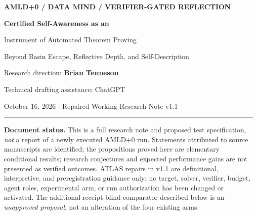 \documentclass[11pt,letterpaper]{article}
\begin{document}
\begin{center}
{\footnotesize\sffamily\bfseries\color{accent} AMLD+0 / DATA MIND / VERIFIER-GATED REFLECTION}\par
\vspace{8pt}
{\LARGE\bfseries\color{ink} Certified Self-Awareness as an\par Instrument of Automated Theorem Proving}\par
\vspace{7pt}
{\large Beyond Basin Escape, Reflective Depth, and Self-Description}\par
\vspace{13pt}
{\normalsize Research direction: \textbf{Brian Tenneson}}\par
{\small Technical drafting assistance: ChatGPT}\par
\vspace{5pt}
{\small October 16, 2026 \quad $\cdot$ \quad Repaired Working Research Note v1.1}\par
\vspace{10pt}
\rule{.86\linewidth}{.5pt}
\end{center}

\begin{statusbox}
\textbf{Document status.} This is a full research note and proposed test specification, \emph{not} a report of a newly executed AMLD+0 run. Statements attributed to source manuscripts are identified; the propositions proved here are elementary conditional results; research conjectures and expected performance gains are not presented as verified outcomes. ATLAS repairs in v1.1 are definitional, interpretive, and preregistration guidance only: no target, solver, verifier, budget, agent roles, experimental arm, or run authorization has been changed or activated. The additional receipt-blind comparator described below is an \emph{unapproved proposal}, not an alteration of the four existing arms.
\end{statusbox}
\end{document}
